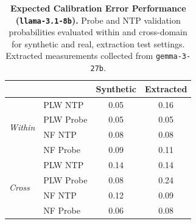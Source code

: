 \begin{table}[ht]
\centering
\begin{tabular}{ll cc}
\toprule
& & Synthetic & Extracted \\
\midrule
\multirow{4}{*}{\textit{Within}}
& PLW NTP & 0.05 & 0.16 \\
& PLW Probe & 0.05 & 0.05 \\
& NF NTP & 0.08 & 0.08 \\
& NF Probe & 0.09 & 0.11 \\
\midrule
\multirow{4}{*}{\textit{Cross}}
& PLW NTP & 0.14 & 0.14 \\
& PLW Probe & 0.08 & 0.24 \\
& NF NTP & 0.12 & 0.09 \\
& NF Probe & 0.06 & 0.08 \\
\bottomrule
\end{tabular}
\caption{\textbf{Expected Calibration Error Performance (\texttt{llama-3.1-8b}).} Probe and NTP validation probabilities evaluated within and cross-domain for synthetic and real, extraction test settings. Extracted measurements collected from \texttt{gemma-3-27b}.}
\label{tab:llama-3.1-8b-gemma-3-27b}
\end{table}
